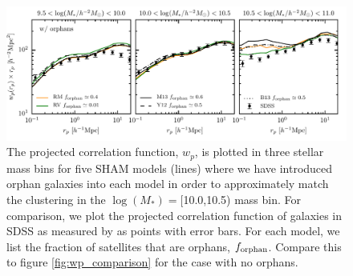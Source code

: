 \documentclass[useAMS,fleqn,usenatbib]{mnras}
\begin{document}
\begin{figure}
    \includegraphics[width=\textwidth]{figures/wp_comparison_w_orphans_c.pdf}
    \caption{The projected correlation function, $w_p$, is plotted in three stellar mass bins for five SHAM models (lines) where we have introduced orphan galaxies into each model in order to approximately match the clustering in the $\log(M_*)=$[10.0,10.5) mass bin. For comparison, we plot the projected correlation function of galaxies in SDSS as measured by \citet{Yang:2012ew} as points with error bars.  For each model, we list the fraction of satellites that are orphans, $f_{\rm orphan}$.  Compare this to figure \ref{fig:wp_comparison} for the case with no orphans.}
    \label{fig:wp_comparison_w_orphans}
\end{figure}
\end{document}
